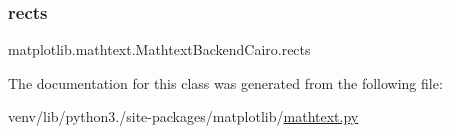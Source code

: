 \subsubsection{\texorpdfstring{rects}{rects}}
{\footnotesize\ttfamily matplotlib.\+mathtext.\+Mathtext\+Backend\+Cairo.\+rects}



The documentation for this class was generated from the following file\+:\begin{DoxyCompactItemize}
\item 
venv/lib/python3./site-\/packages/matplotlib/\hyperlink{mathtext_8py}{mathtext.\+py}\end{DoxyCompactItemize}
